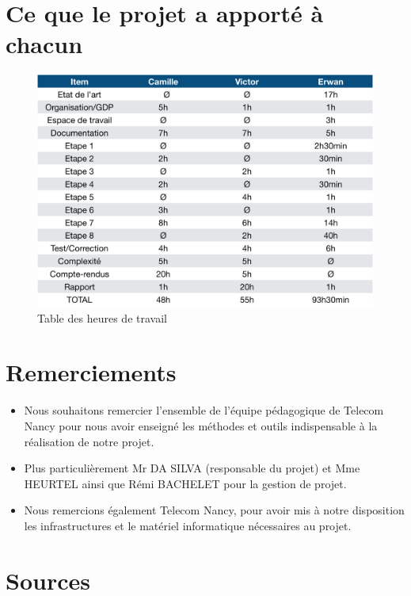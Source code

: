 \documentclass{article}
\begin{document}
 \section{ Ce que le projet a apporté à chacun}


\begin{figure}[H]
    \centering
    \includegraphics[scale=0.5]{TableHeures.png}
    \caption{Table des heures de travail}
    \label{fig:tableheures}
\end{figure}


\section{ Remerciements}


\begin{itemize}
    \item Nous souhaitons remercier l’ensemble de l’équipe pédagogique de Telecom Nancy pour nous avoir enseigné les méthodes et outils indispensable à la réalisation de notre projet.
    \item Plus particulièrement Mr DA SILVA (responsable du projet) et Mme HEURTEL ainsi que Rémi BACHELET pour la gestion de projet.
    \item Nous remercions également Telecom Nancy, pour avoir mis à notre disposition les infrastructures et le matériel informatique nécessaires au projet.
    \end{itemize}

\section{ Sources }
\end{document}
